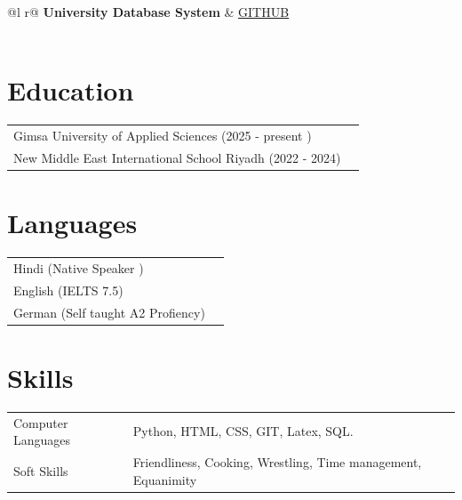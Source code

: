 \documentclass[a4paper,12pt]{article}
\begin{document}
\begin{tabularx}{\linewidth}{ @{}l r@{} }
\textbf{University Database System} & \hfill \href{https://some-link.com}{GITHUB} \\[3.75pt]
  \\
\end{tabularx}


\section{Education}
\begin{tabularx}{\linewidth}{@{}l X@{}}	 
Gimsa University of Applied Sciences 
\hfill (2025 - present )\\

New Middle East International School Riyadh
\hfill (2022 - 2024) \\
\end{tabularx}

\section{Languages}
\begin{tabularx}{\linewidth}{@{}l X@{}}	

Hindi
\hfill (Native Speaker )\\

English
\hfill (IELTS 7.5) \\

German
\hfill (Self taught A2 Profiency) \\

\end{tabularx}




\section{Skills}
\begin{tabularx}{\linewidth}{@{}l X@{}}
Computer Languages &  \normalsize{Python, HTML, CSS, GIT, Latex, SQL.}\\
Soft Skills  &  \normalsize{Friendliness, Cooking, Wrestling, Time management, Equanimity}\\  
\end{tabularx}
\end{document}
